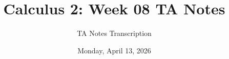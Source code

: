 \documentclass[11pt, a4paper]{article}
\theoremstyle{colonstyle}
\begin{document}
\title{Calculus 2: Week 08 TA Notes}
\author{TA Notes Transcription}
\date{Monday, April 13, 2026} 







\end{document}
